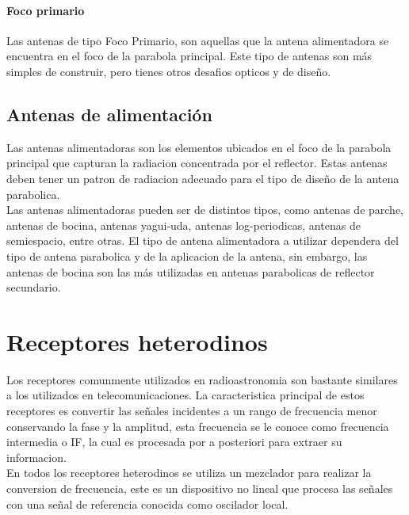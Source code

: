 \paragraph{Foco primario}

Las antenas de tipo Foco Primario, son aquellas que la antena alimentadora se encuentra en el foco de la parabola principal. Este tipo de antenas son más simples de construir, pero tienes otros desafios opticos y de diseño.\\

\subsection{Antenas de alimentación}

Las antenas alimentadoras son los elementos ubicados en el foco de la parabola principal que capturan la radiacion concentrada por el reflector. Estas antenas deben tener un patron de radiacion adecuado para el tipo de diseño de la antena parabolica.\\

Las antenas alimentadoras pueden ser de distintos tipos, como antenas de parche, antenas de bocina, antenas yagui-uda, antenas log-periodicas, antenas de semiespacio, entre otras. El tipo de antena alimentadora a utilizar dependera del tipo de antena parabolica y de la aplicacion de la antena, sin embargo, las antenas de bocina son las más utilizadas en antenas parabolicas de reflector secundario.\\


\section{Receptores heterodinos}

Los receptores comunmente utilizados en radioastronomia son bastante similares a los utilizados en telecomunicaciones. La caracteristica principal de estos receptores es convertir las señales incidentes a un rango de frecuencia menor conservando la fase y la amplitud, esta frecuencia se le conoce como frecuencia intermedia o IF, la cual es procesada por a posteriori para extraer su informacion\cite{Finger2013}.\\

En todos los receptores heterodinos se utiliza un mezclador para realizar la conversion de frecuencia, este es un dispositivo no lineal que procesa las señales con una señal de referencia conocida como oscilador local.\\


